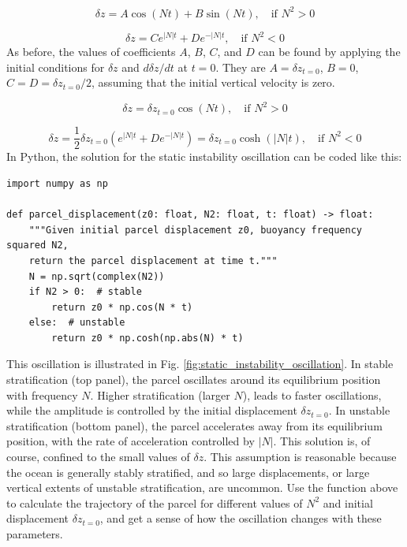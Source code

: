 \documentclass[12pt]{article}
\numberwithin{equation}{section}
\numberwithin{figure}{section}
\numberwithin{table}{section}
\begin{document}
\begin{equation}
  \delta z = A \cos(N t) + B \sin(N t), \quad \text{if } N^2 > 0
\end{equation}

\begin{equation}
  \delta z = C e^{|N| t} + D e^{-|N| t}, \quad \text{if } N^2 < 0
\end{equation}
As before, the values of coefficients $A$, $B$, $C$, and $D$ can be found by
applying the initial conditions for $\delta z$ and $d \delta z / dt$ at $t = 0$.
They are $A = \delta z_{t=0}$, $B = 0$, $C = D = \delta z_{t=0} / 2$, assuming
that the initial vertical velocity is zero.

\begin{equation}
  \delta z = \delta z_{t=0} \cos(N t), \quad \text{if } N^2 > 0
\end{equation}

\begin{equation}
  \delta z = \frac{1}{2} \delta z_{t=0} \left( e^{|N| t} + D e^{-|N| t} \right) = \delta z_{t=0} \cosh(|N| t), \quad \text{if } N^2 < 0
\end{equation}
In Python, the solution for the static instability oscillation can be coded
like this:


\begin{listing}[h]
\begin{verbatim}
import numpy as np

def parcel_displacement(z0: float, N2: float, t: float) -> float:
    """Given initial parcel displacement z0, buoyancy frequency squared N2,
    return the parcel displacement at time t."""
    N = np.sqrt(complex(N2))
    if N2 > 0:  # stable
        return z0 * np.cos(N * t)
    else:  # unstable
        return z0 * np.cosh(np.abs(N) * t)
\end{verbatim}
\label{lst:static_instability_oscillation}
\end{listing}

This oscillation is illustrated in Fig. \ref{fig:static_instability_oscillation}.
In stable stratification (top panel), the parcel oscillates around its
equilibrium position with frequency $N$.
Higher stratification (larger $N$), leads to faster oscillations, while the
amplitude is controlled by the initial displacement $\delta z_{t=0}$.
In unstable stratification (bottom panel), the parcel accelerates away from
its equilibrium position, with the rate of acceleration controlled by $|N|$.
This solution is, of course, confined to the small values of $\delta z$.
This assumption is reasonable because the ocean is generally stably stratified,
and so large displacements, or large vertical extents of unstable stratification,
are uncommon.
Use the function above to calculate the trajectory of the parcel for different
values of $N^2$ and initial displacement $\delta z_{t=0}$, and get a sense of
how the oscillation changes with these parameters.
\end{document}

